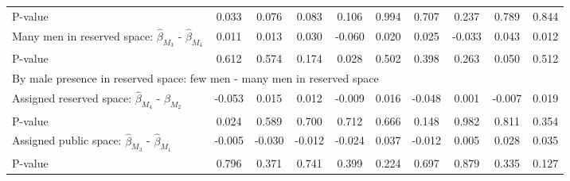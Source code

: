 \begin{tabular}{l*{9}{c}}
\quad P-value       &       0.033         &       0.076         &       0.083         &       0.106         &       0.994         &       0.707         &       0.237         &       0.789         &       0.844         \\
\quad Many men in reserved space: $\hat\beta_{M_3}$ - $\hat\beta_{M_4}$&       0.011         &       0.013         &       0.030         &      -0.060         &       0.020         &       0.025         &      -0.033         &       0.043         &       0.012         \\
\quad P-value       &       0.612         &       0.574         &       0.174         &       0.028         &       0.502         &       0.398         &       0.263         &       0.050         &       0.512         \\
\multicolumn{10}{l}{By male presence in reserved space: few men - many men in reserved space} \\ \quad Assigned reserved space: $\hat\beta_{M_4}$ - $\hat\beta_{M_2}$&      -0.053         &       0.015         &       0.012         &      -0.009         &       0.016         &      -0.048         &       0.001         &      -0.007         &       0.019         \\
\quad P-value       &       0.024         &       0.589         &       0.700         &       0.712         &       0.666         &       0.148         &       0.982         &       0.811         &       0.354         \\
\quad Assigned public space: $\hat\beta_{M_3}$ - $\hat\beta_{M_1}$&      -0.005         &      -0.030         &      -0.012         &      -0.024         &       0.037         &      -0.012         &       0.005         &       0.028         &       0.035         \\
\quad P-value       &       0.796         &       0.371         &       0.741         &       0.399         &       0.224         &       0.697         &       0.879         &       0.335         &       0.127         \\
\hline\hline \end{tabular}
